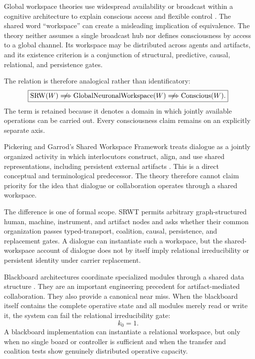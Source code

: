 Global workspace theories use widespread availability or broadcast within a
cognitive architecture to explain conscious access and flexible control
\cite{SRWT:Baars1988,SRWT:DehaeneChangeux2011}. The shared word ``workspace'' can create
a misleading implication of equivalence. The theory neither assumes a
single broadcast hub nor defines consciousness by access to a global channel.
Its workspace may be distributed across agents and artifacts, and its
existence criterion is a conjunction of structural, predictive, causal,
relational, and persistence gates.

The relation is therefore analogical rather than identificatory:
\[
\boxed{
\operatorname{SRW}(W)
\centernot\Longrightarrow
\operatorname{GlobalNeuronalWorkspace}(W)
\centernot\Longrightarrow
\operatorname{Conscious}(W).
}
\]
The term is retained because it denotes a domain in which jointly
available operations can be carried out. Every consciousness claim remains on
an explicitly separate axis.


Pickering and Garrod's Shared Workspace Framework treats dialogue as a jointly
organized activity in which interlocutors construct, align, and use shared
representations, including persistent external artifacts
\cite{SRWT:PickeringGarrod2021}. This is a direct conceptual and terminological
predecessor. The theory therefore cannot claim priority for the idea
that dialogue or collaboration operates through a shared workspace.

The difference is one of formal scope. SRWT permits arbitrary graph-structured
human, machine, instrument, and artifact nodes and asks whether their common
organization passes typed-transport, coalition, causal, persistence, and
replacement gates. A dialogue can instantiate such a workspace, but the
shared-workspace account of dialogue does not by itself imply relational
irreducibility or persistent identity under carrier replacement.


Blackboard architectures coordinate specialized modules through a shared data
structure \cite{SRWT:HayesRoth1985}. They are an important engineering precedent
for artifact-mediated collaboration. They also provide a canonical near
miss. When the blackboard itself contains the complete operative state and
all modules merely read or write it, the system can fail the relational
irreducibility gate:
\[
k_0=1.
\]
A blackboard implementation can instantiate a relational workspace, but only
when no single board or controller is sufficient and when the transfer and
coalition tests show genuinely distributed operative capacity.


